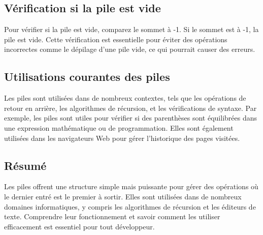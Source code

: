 \subsection{Vérification si la pile est vide}
Pour vérifier si la pile est vide, comparez le sommet à -1. Si le sommet est à -1, la pile est vide. Cette vérification est essentielle pour éviter des opérations incorrectes comme le dépilage d'une pile vide, ce qui pourrait causer des erreurs.

\subsection{Utilisations courantes des piles}
Les piles sont utilisées dans de nombreux contextes, tels que les opérations de retour en arrière, les algorithmes de récursion, et les vérifications de syntaxe. Par exemple, les piles sont utiles pour vérifier si des parenthèses sont équilibrées dans une expression mathématique ou de programmation. Elles sont également utilisées dans les navigateurs Web pour gérer l'historique des pages visitées.

\subsection{Résumé}
Les piles offrent une structure simple mais puissante pour gérer des opérations où le dernier entré est le premier à sortir. Elles sont utilisées dans de nombreux domaines informatiques, y compris les algorithmes de récursion et les éditeurs de texte. Comprendre leur fonctionnement et savoir comment les utiliser efficacement est essentiel pour tout développeur.


